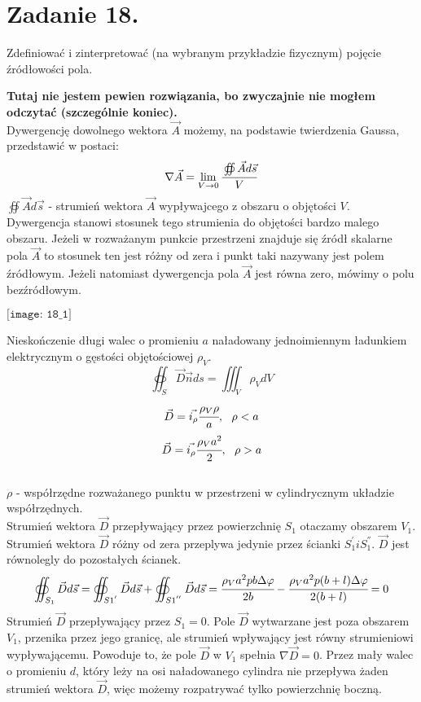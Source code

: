 \section*{Zadanie 18.}
\begin{task}
Zdefiniować i zinterpretować (na wybranym przykładzie fizycznym) pojęcie źródłowości pola.\\
\end{task}

\begin{solution}
\textbf{Tutaj nie jestem pewien rozwiązania, bo zwyczajnie nie mogłem odczytać (szczególnie koniec).}\\
Dywergencję dowolnego wektora $\vec{A}$ możemy, na podstawie twierdzenia Gaussa, przedstawić w postaci:
$$\nabla\vec{A}=\lim_{V\to 0}\cfrac{\oiint\vec{A}d\vec{s}}{V}$$
$\oiint\vec{A}d\vec{s}$ - strumień wektora $\vec{A}$ wypływajcego z obszaru o objętości $V$. Dywergencja stanowi stosunek tego strumienia do objętości bardzo malego obszaru. Jeżeli w rozważanym punkcie przestrzeni znajduje się źródł skalarne pola $\vec{A}$ to stosunek ten jest różny od zera i punkt taki nazywany jest polem źródłowym. Jeżeli natomiast dywergencja pola $\vec{A}$ jest równa zero, mówimy o polu bezźródłowym.\\
\begin{center}
$\texttt{[image: 18\_1]}$\\
\end{center}
Nieskończenie długi walec o promieniu $a$ naładowany jednoimiennym ładunkiem elektrycznym o gęstości objętościowej $\rho_{V}$.
$$\oiint_{S}\vec{D}\vec{n}ds=\iiint_{V}\rho_{V}dV$$
$$\vec{D}=\vec{i_{\rho}}\cfrac{\rho_{V}\rho}{a},\ \ \rho <a$$
$$\vec{D}=\vec{i_{\rho}}\cfrac{\rho_{V}a^{2}}{2},\ \ \rho >a$$\\ $\rho$ - współrzędne rozważanego punktu w przestrzeni w cylindrycznym układzie współrzędnych.\\
Strumień wektora $\vec{D}$ przepływający przez powierzchnię $S_{1}$ otaczamy obszarem $V_{1}$. Strumień wektora $\vec{D}$ różny od zera przeplywa jedynie przez ścianki $S_{1}^{'} i S_{1}^{''}$. $\vec{D}$ jest równolegly do pozostałych ścianek.
$$\oiint_{S_{1}}\vec{D}d\vec{s}=\oiint_{S{1}^{'}}\vec{D}d\vec{s}+\oiint_{S{1}^{''}}\vec{D}d\vec{s}=
\cfrac{\rho_{V}a^{2}pb\Delta\varphi}{2b} - \cfrac{\rho_{V}a^{2}p(b+l)\Delta\varphi}{2(b+l)}=0$$
Strumień $\vec{D}$ przepływający przez $S_{1}=0$. Pole $\vec{D}$ wytwarzane jest poza obszarem $V_{1}$, przenika przez jego granicę, ale strumień wpływający jest równy strumieniowi wypływającemu. Powoduje to, że pole $\vec{D}$ w $V_{1}$ spełnia $\nabla\vec{D}=0$. Przez mały walec o promieniu $d$, który leży na osi naładowanego cylindra nie przepływa żaden strumień wektora $\vec{D}$, więc możemy rozpatrywać tylko powierzchnię boczną.\\

\end{solution}
